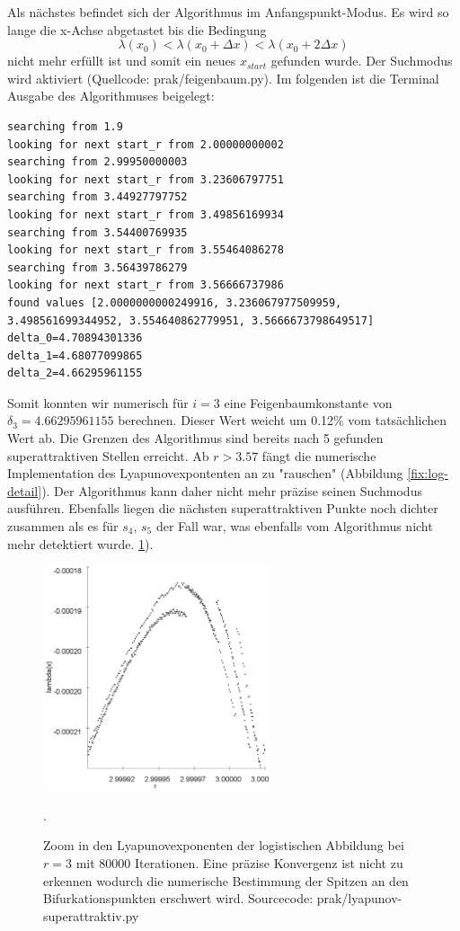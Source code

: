 \documentclass[12pt,a4paper]{article}
\begin{document}
Als nächstes befindet sich der Algorithmus im Anfangspunkt-Modus. Es wird so lange die x-Achse abgetastet bis die Bedingung 
\begin{equation}
\lambda(x_0) < \lambda(x_0 + \Delta x) < \lambda(x_0 + 2\Delta x)
\end{equation}
nicht mehr erfüllt ist und somit ein neues $x_{start}$ gefunden wurde. Der Suchmodus wird aktiviert  (Quellcode: prak/feigenbaum.py).
Im folgenden ist die Terminal Ausgabe des Algorithmuses beigelegt:
\begin{lstlisting}
searching from 1.9
looking for next start_r from 2.00000000002
searching from 2.99950000003
looking for next start_r from 3.23606797751
searching from 3.44927797752
looking for next start_r from 3.49856169934
searching from 3.54400769935
looking for next start_r from 3.55464086278
searching from 3.56439786279
looking for next start_r from 3.56666737986
found values [2.0000000000249916, 3.236067977509959, 3.498561699344952, 3.554640862779951, 3.5666673798649517]
delta_0=4.70894301336
delta_1=4.68077099865
delta_2=4.66295961155
\end{lstlisting}
Somit konnten wir numerisch für $i=3$ eine Feigenbaumkonstante von $\delta_3=4.66295961155$ berechnen. Dieser Wert weicht um 0.12\% vom tatsächlichen Wert ab. Die Grenzen des Algorithmus sind bereits nach 5 gefunden superattraktiven Stellen erreicht. Ab $r>3.57$ fängt die numerische Implementation des Lyapunovexpontenten an zu "rauschen" (Abbildung \ref{fix:log-detail}). Der Algorithmus kann daher nicht mehr präzise seinen Suchmodus ausführen. Ebenfalls liegen die nächsten superattraktiven Punkte noch dichter zusammen als es für $s_4$, $s_5$ der Fall war, was ebenfalls vom Algorithmus nicht mehr detektiert wurde. 
\ref{fig:lya-rauschen}).
\begin{figure}[!htbp]
\centering
\includegraphics[height=250px]{lya-rauschen}
\caption{Zoom in den Lyapunovexponenten der logistischen Abbildung bei $r=3$ mit 80000 Iterationen. 
Eine präzise Konvergenz ist nicht zu erkennen wodurch die numerische Bestimmung der Spitzen an den Bifurkationspunkten erschwert wird. Sourcecode: prak/lyapunov-superattraktiv.py}. 
\label{fig:lya-rauschen}
\end{figure}
\end{document}
